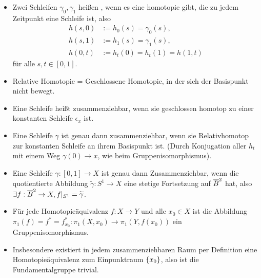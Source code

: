 \documentclass[8pt]{extarticle}
\begin{document}
\begin{itemize}
\begin{align*}
	\end{align*}
	für $\delta$ ein beliebiger Weg von $x$ nach $y$. Insbesondere sind alle Fundamentalgruppen isomorph, wenn $X$ wegzusammenhängend ist.
	\item Zwei Schleifen $\gamma_0, \gamma_1$ heißen , wenn es eine homotopie gibt, die zu jedem Zeitpunkt eine Schleife ist, also 
	\begin{align*}
		h(s,0) &:= h_0(s) = \gamma_0(s),\\
		h(s,1) &:= h_1(s) = \gamma_1(s),\\
		h(0,t) &:= h_t(0) = h_t(1) = h(1,t)
	\end{align*}
	für alle $s,t \in [0,1]$.
	\item Relative Homotopie = Geschlossene Homotopie, in der sich der Basispunkt nicht bewegt.
	\item Eine Schleife heißt zusammenziehbar, wenn sie geschlossen homotop zu einer konstanten Schleife $\epsilon_x$ ist.
	\item Eine Schleife $\gamma$ ist genau dann zusammenziehbar, wenn sie Relativhomotop zur konstanten Schleife an ihrem Basispunkt ist. (Durch Konjugation aller $h_t$ mit einem Weg $\gamma(0) \to x$, wie beim Gruppenisomorphismus).
	\item Eine Schleife $\gamma : [0,1] \to X$ ist genau dann Zusammenziehbar, wenn die quotientierte Abbildung $\tilde \gamma : S^1 \to X$ eine stetige Fortsetzung auf $\overline{{B}}^2$ hat, also $\exists f : \overline{{B}}^2 \to X, f|_{S^1} = \widetilde \gamma$.
	\item Für jede Homotopieäquivalenz $f : X \to Y$ und alle $x_0 \in X$ ist die Abbildung $\pi_1(f) = f^* = f^*_{x_0} : \pi_1(X,x_0) \to \pi_1(Y, f(x_0))$ ein Gruppenisomorphismus.
	\item 
	Insbesondere existiert in jedem zusammenziehbaren Raum per Definition eine Homotopieäquivalenz zum Einpunktraum $\qty{x_0}$, also ist die Fundamentalgruppe trivial.
\end{itemize}
\end{document}
